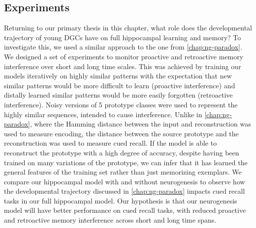 \subsection{Experiments}

Returning to our primary thesis in this chapter, what role does the developmental trajectory 
of young \acp{DGC} have on full hippocampal learning and memory?
To investigate this, we used a similar approach to the one from \cref{chap:ng-paradox}.
We designed a set of experiments to monitor proactive and retroactive 
memory interference over short and long time scales.
This was achieved by training our models iteratively on highly similar patterns with the expectation 
that new similar patterns would be more difficult to learn (proactive interference) and 
distally learned similar patterns would be more easily forgotten (retroactive interference).
Noisy versions of 5 prototype classes were used to represent the highly similar sequences, 
intended to cause interference.
Unlike in \cref{chap:ng-paradox}, where the Hamming distance between the input and 
reconstruction was used to measure encoding, the distance between the source prototype 
and the reconstruction was used to measure cued recall.
If the model is able to reconstruct the prototype with a high degree of accuracy, 
despite having been trained on many variations of the prototype, we can infer 
that it has learned the general features of the training set rather than just memorizing exemplars. 
We compare our hippocampal model with and without neurogenesis to observe how the 
developmental trajectory discussed in \cref{chap:ng-paradox} impacts cued recall tasks in 
our full hippocampal model.
Our hypothesis is that our neurogenesis model will have better performance on cued recall 
tasks, with reduced proactive and retroactive memory interference across short 
and long time spans.


